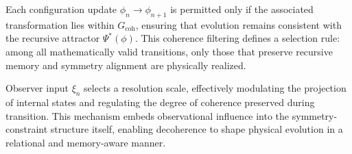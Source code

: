 Each configuration update $\phi_n \to \phi_{n+1}$ is permitted only if the associated transformation lies within $G_{\text{coh}}$, ensuring that evolution remains consistent with the recursive attractor $\Psi^*(\phi)$. This coherence filtering defines a selection rule: among all mathematically valid transitions, only those that preserve recursive memory and symmetry alignment are physically realized.

Observer input $\xi_n$ selects a resolution scale, effectively modulating the projection of internal states and regulating the degree of coherence preserved during transition. This mechanism embeds observational influence into the symmetry-constraint structure itself, enabling decoherence to shape physical evolution in a relational and memory-aware manner.
